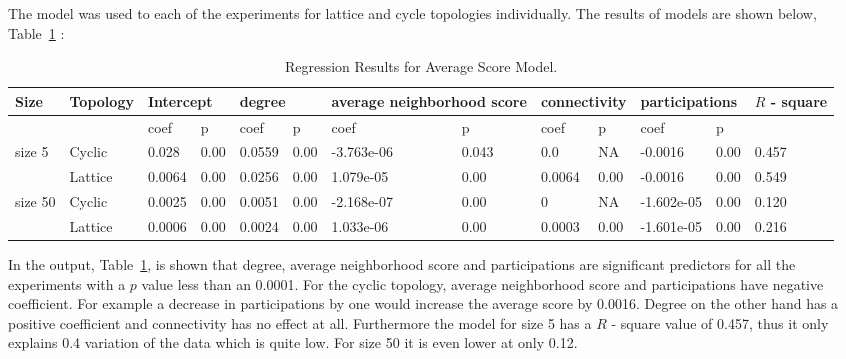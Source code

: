 The model was used to each of the experiments for lattice and cycle topologies
individually. The results of models are shown below, Table~\ref{regression-average} :
\begin{table}[H]
\centering
\begin{adjustbox}{width=1\textwidth}
\small
\begin{tabular}{@{}|l|l|l|l|l|l|l|l|l|l|l|l|l|@{}}
\toprule
Size & Topology & \multicolumn{2}{l|}{Intercept} & \multicolumn{2}{l|}{degree} & \multicolumn{2}{l|}{average neighborhood score} & \multicolumn{2}{l|}{connectivity} & \multicolumn{2}{l|}{participations} & \(R\) - square \\ \midrule
        &          & coef            & p            & coef          & p           & coef                      & p                    & coef             & p              & coef                & p             &          \\ \midrule
size 5  & Cyclic    & 0.028           & 0.00         & 0.0559        & 0.00        & -3.763e-06                & 0.043                & 0.0              & NA             & -0.0016             & 0.00          & 0.457    \\ \midrule
        & Lattice  & 0.0064          & 0.00         & 0.0256        & 0.00        & 1.079e-05                 & 0.00                 & 0.0064           & 0.00           & -0.0016             & 0.00          & 0.549    \\ \midrule
size 50 & Cyclic    & 0.0025          & 0.00         & 0.0051        & 0.00        & -2.168e-07                & 0.00                 & 0                & NA             & -1.602e-05          & 0.00          & 0.120    \\ \midrule
        & Lattice  & 0.0006          & 0.00         & 0.0024        & 0.00        & 1.033e-06                 & 0.00                 & 0.0003           & 0.00           & -1.601e-05          & 0.00          & 0.216    \\ \bottomrule
\end{tabular}
\end{adjustbox}
\caption{Regression Results for Average Score Model.}
\label{regression-average}
\end{table}

In the output, Table~\ref{regression-average}, is shown that degree, average
neighborhood score and participations
are significant predictors for all the experiments with a \(p\) value less than
an 0.0001.
For the cyclic topology, average neighborhood score and participations have negative
coefficient. For example a decrease in participations by one would increase
the average score by 0.0016. Degree on the other hand has a positive coefficient
and connectivity has no effect at all. Furthermore the model for size 5 has
a \(R\) - square value of 0.457, thus it only explains 0.4 variation of the data which is
quite low. For size 50 it is even lower at only 0.12.


